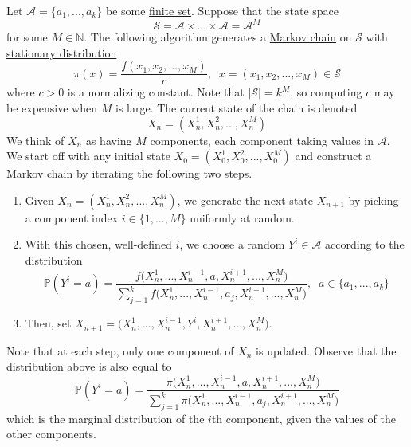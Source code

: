    Let $\mathcal{A} = \{a_1, ..., a_k\}$ be some \hyperref[st-def:finite-set]{finite set}. Suppose that the state space 
    \begin{equation}
      \mathcal{S} = \mathcal{A} \times ... \times \mathcal{A} = \mathcal{A}^M
    \end{equation}
    for some $M \in \mathbb{N}$. The following algorithm generates a \hyperref[def:markov-chain]{Markov chain} on $\mathcal{S}$ with \hyperref[def:stationary-distribution]{stationary distribution}
    \begin{equation}
      \pi(x) = \frac{f(x_1, x_2, ..., x_M)}{c}, \;\; x = (x_1, x_2, ..., x_M) \in \mathcal{S} 
    \end{equation}
    where $c >0$ is a normalizing constant. Note that $|\mathcal{S}| = k^M$, so computing $c$ may be expensive when $M$ is large. The current state of the chain is denoted 
    \begin{equation}
      X_n = (X_n^1, X_n^2, ..., X_n^M)
    \end{equation}
    We think of $X_n$ as having $M$ components, each component taking values in $\mathcal{A}$. We start off with any initial state $X_0 = (X_0^1, X_0^2, ..., X_0^M)$ and construct a Markov chain by iterating the following two steps. 
    \begin{enumerate}
      \item Given $X_n = (X_n^1, X_n^2, ..., X_n^M)$, we generate the next state $X_{n+1}$ by picking a component index $i \in \{1, ..., M\}$ uniformly at random. 
      \item With this chosen, well-defined $i$, we choose a random $Y^i \in \mathcal{A}$ according to the distribution
      \begin{equation}
        \mathbb{P}(Y^i = a) = \frac{f\big(X_n^1 ,..., X_n^{i-1}, a, X_n^{i+1}, ..., X_n^M\big)}{\sum_{j=1}^k f\big(X_n^1 ,..., X_n^{i-1}, a_j, X_n^{i+1}, ..., X_n^M\big)}, \;\; a \in \{a_1, ..., a_k\}
      \end{equation}
      \item Then, set $X_{n+1} = \big(X_n^1, ..., X_n^{i-1}, Y^i, X_n^{i+1}, ..., X_n^M\big)$. 
    \end{enumerate}
    Note that at each step, only one component of $X_n$ is updated. Observe that the distribution above is also equal to 
    \begin{equation}
      \mathbb{P}(Y^i = a) = \frac{\pi\big(X_n^1 ,..., X_n^{i-1}, a, X_n^{i+1}, ..., X_n^M\big)}{\sum_{j=1}^k \pi \big(X_n^1 ,..., X_n^{i-1}, a_j, X_n^{i+1}, ..., X_n^M\big)}
    \end{equation}
    which is the marginal distribution of the $i$th component, given the values of the other components. 

